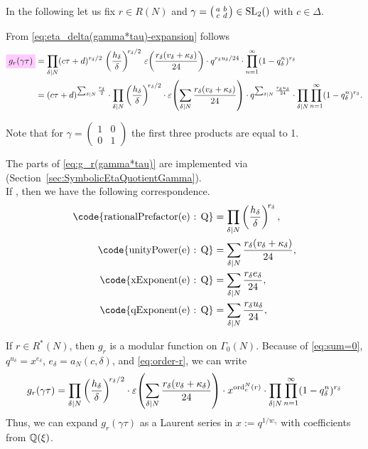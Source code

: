 \documentclass{article}
\begin{document}
In the following let us fix $r \in R(N)$ and
$\gamma =
  \bigl(
  \begin{smallmatrix}
    a & b\\
    c & d
  \end{smallmatrix}
  \bigr)
  \in \SL2Z$ with $c \in \Delta$.

From \eqref{eq:eta_delta(gamma*tau)-expansion} follows
\begin{align}
  \defineNotation[g-r-gamma-tau]{g_r(\gamma \tau)}
  &=
  \divisorprod{N}
  (c \tau+d)^{r_\delta/2}
  \,
  \left(\frac{h_\delta}{\delta}\right)^{\!r_\delta/2}
  \,
  \unityPower{\frac{r_\delta(v_\delta + \kappa_\delta)}{24}}
  \cdot
  q^{r_\delta u_\delta/24}
  \cdot
    \prod_{n=1}^{\infty}(1-q_\delta^n)^{r_\delta}
  \notag
  \\
  &=
  (c \tau+d)^{\divisorsum{N} \frac{r_\delta}{2}}
  \cdot
  \divisorprod{N}
  \left(\frac{h_\delta}{\delta}\right)^{\!r_\delta/2}
  \cdot
  \unityPower{\divisorsum{N} \frac{r_\delta(v_\delta + \kappa_\delta)}{24}}
  \cdot
  q^{\divisorsum{N} \frac{r_\delta u_\delta}{24}}
  \cdot
    \divisorprod{N} \prod_{n=1}^{\infty}(1-q_\delta^n)^{r_\delta}.
  \label{eq:g_r(gamma*tau)}
\end{align}

Note that for
$\gamma=\left(\begin{smallmatrix}1&0\\0&1\end{smallmatrix}\right)$ the
first three products are equal to 1.


The parts of \eqref{eq:g_r(gamma*tau)} are implemented via
\textcolor{blue}{}
(Section~\ref{sec:SymbolicEtaQuotientGamma}).
\\
If , then we have the following
correspondence.
\begin{align*}
  \text{\code{rationalPrefactor(e) : Q}}
  &=
    \divisorprod{N} \left(\frac{h_\delta}{\delta}\right)^{\!r_\delta},
  \\
  \text{\code{unityPower(e) : Q}}
  &=
    \divisorsum{N} \frac{r_\delta(v_\delta + \kappa_\delta)}{24},
  \\
  \text{\code{xExponent(e) : Q}}
  &=
    \divisorsum{N} \frac{r_\delta e_\delta}{24},
  \\
  \text{\code{qExponent(e) : Q}}
  &=
    \divisorsum{N} \frac{r_\delta u_\delta}{24},
\end{align*}

If $r\in R^*(N)$, then $g_r$ is a modular function on $\Gamma_0(N)$.
Because of \eqref{eq:sum=0}, $q^{u_\delta}=x^{e_\delta}$,
$e_\delta=a_N(c, \delta)$, and \eqref{eq:order-r}, we can write
\begin{align}
  g_r(\gamma \tau)
  &=
  \prod_{\delta \mid N}
  \left(\frac{h_\delta}{\delta}\right)^{\!r_\delta/2}
  \cdot
  \varepsilon\!\left(\sum_{\delta \mid N} \frac{r_\delta(v_\delta + \kappa_\delta)}{24}\right)
  \cdot
  x^{\operatorname{ord}^N_c(r)}
  \cdot
  \prod_{\delta \mid N}
    \prod_{n=1}^{\infty}(1-q_\delta^n)^{r_\delta}\notag\\
  \label{eq:modular-g_r(gamma*tau)}
\end{align}
Thus, we can expand $g_r(\gamma\tau)$ as a Laurent series in
$x:=q^{1/w_\gamma}$ with coefficients from $\mathbb{Q}(\xi)$.
\end{document}
